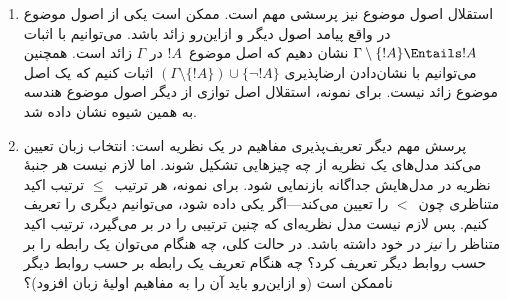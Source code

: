\documentclass[../../../include/open-logic-section]{subfiles}
\begin{document}
\begin{explain}
\begin{enumerate}
  باشد، می‌توانیم با روش‌های منطقی آن‌ها را بررسی کنیم و نیز مدل‌هایی
  بسازیم.
\item استقلال اصول موضوع نیز پرسشی مهم است. ممکن است یکی از اصول موضوع
  در واقع پیامد اصول دیگر و ازاین‌رو زائد باشد. می‌توانیم با اثبات
  $\Gamma \setminus \{!A\} \Entails !A$ نشان دهیم که اصل موضوع~$!A$ در
  $\Gamma$ زائد است. همچنین می‌توانیم با نشان‌دادن ارضاپذیری
  $(\Gamma \setminus \{!A\}) \cup \{\lnot !A\}$ اثبات کنیم که یک اصل
  موضوع زائد نیست. برای نمونه، استقلال اصل توازی از دیگر اصول موضوع
  هندسه به همین شیوه نشان داده شد.
\item پرسش مهم دیگر تعریف‌پذیری مفاهیم در یک نظریه است: انتخاب زبان
  تعیین می‌کند مدل‌های یک نظریه از چه چیزهایی تشکیل شوند. اما لازم نیست
  هر جنبهٔ نظریه در مدل‌هایش جداگانه بازنمایی شود. برای نمونه، هر
  ترتیب~$\le$ ترتیب اکید متناظری چون~$<$ را تعیین می‌کند---اگر یکی داده
  شود، می‌توانیم دیگری را تعریف کنیم. پس لازم نیست مدل نظریه‌ای که چنین
  ترتیبی را در بر می‌گیرد، ترتیب اکید متناظر را \emph{نیز} در خود داشته
  باشد. در حالت کلی، چه هنگام می‌توان یک رابطه را بر حسب روابط دیگر
  تعریف کرد؟ چه هنگام تعریف یک رابطه بر حسب روابط دیگر ناممکن است (و
  ازاین‌رو باید آن را به مفاهیم اولیهٔ زبان افزود)؟
\end{enumerate}
\end{explain}
\end{document}
